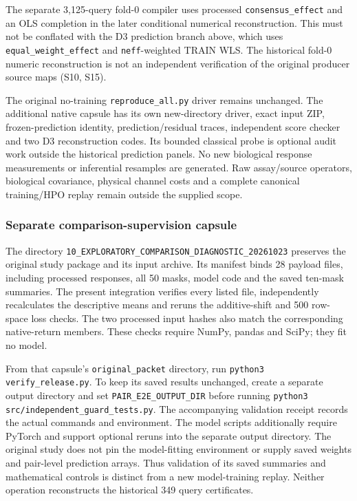 \documentclass[11pt]{article}
\begin{document}
The separate 3,125-query fold-0 compiler uses processed \texttt{consensus\_effect} and an OLS completion in the later conditional numerical reconstruction. This must not be conflated with the D3 prediction branch above, which uses \texttt{equal\_weight\_effect} and \texttt{neff}-weighted TRAIN WLS. The historical fold-0 numeric reconstruction is not an independent verification of the original producer source maps (S10, S15).

The original no-training \texttt{reproduce\_all.py} driver remains unchanged. The additional native capsule has its own new-directory driver, exact input ZIP, frozen-prediction identity, prediction/residual traces, independent score checker and two D3 reconstruction codes. Its bounded classical probe is optional audit work outside the historical prediction panels. No new biological response measurements or inferential resamples are generated. Raw assay/source operators, biological covariance, physical channel costs and a complete canonical training/HPO replay remain outside the supplied scope.



\subsubsection{Separate comparison-supervision capsule}
The directory \texttt{10\_EXPLORATORY\_COMPARISON\_DIAGNOSTIC\_20261023} preserves the original study package and its input archive. Its manifest binds 28 payload files, including processed responses, all 50 masks, model code and the saved ten-mask summaries. The present integration verifies every listed file, independently recalculates the descriptive means and reruns the additive-shift and 500 row-space loss checks. The two processed input hashes also match the corresponding native-return members. These checks require NumPy, pandas and SciPy; they fit no model.

From that capsule's \texttt{original\_packet} directory, run \texttt{python3 verify\_release.py}. To keep its saved results unchanged, create a separate output directory and set \texttt{PAIR\_E2E\_OUTPUT\_DIR} before running \texttt{python3 src/independent\_guard\_tests.py}. The accompanying validation receipt records the actual commands and environment. The model scripts additionally require PyTorch and support optional reruns into the separate output directory. The original study does not pin the model-fitting environment or supply saved weights and pair-level prediction arrays. Thus validation of its saved summaries and mathematical controls is distinct from a new model-training replay. Neither operation reconstructs the historical 349 query certificates.
\end{document}
